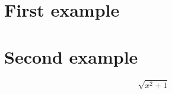 \documentclass{article}
\begin{document}
\section{First example}
\section{Second example}
\begin{equation*}
    \sqrt{x^2+1}
\end{equation*}
\end{document}
